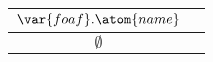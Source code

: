 \begin{tabular}{|c|c|}
	\hline
	$\var{foaf}.\atom{name}$ \\ \hline
	$\emptyset$ \\ \hline
\end{tabular}

